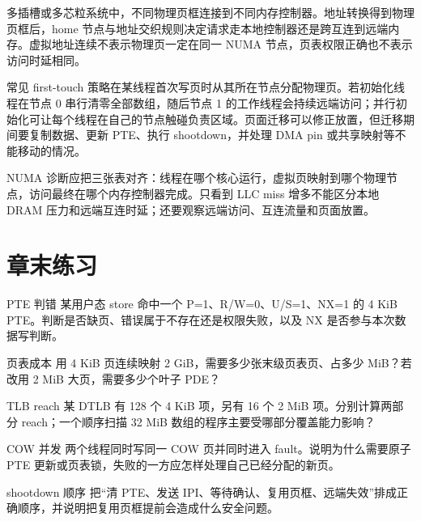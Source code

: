 
多插槽或多芯粒系统中，不同物理页框连接到不同内存控制器。地址转换得到物理页框后，home 节点与地址交织规则决定请求走本地控制器还是跨互连到远端内存。虚拟地址连续不表示物理页一定在同一 NUMA 节点，页表权限正确也不表示访问时延相同。

常见 first-touch 策略在某线程首次写页时从其所在节点分配物理页。若初始化线程在节点 0 串行清零全部数组，随后节点 1 的工作线程会持续远端访问；并行初始化可让每个线程在自己的节点触碰负责区域。页面迁移可以修正放置，但迁移期间要复制数据、更新 PTE、执行 shootdown，并处理 DMA pin 或共享映射等不能移动的情况。

NUMA 诊断应把三张表对齐：线程在哪个核心运行，虚拟页映射到哪个物理节点，访问最终在哪个内存控制器完成。只看到 LLC miss 增多不能区分本地 DRAM 压力和远端互连时延；还要观察远端访问、互连流量和页面放置。

\section*{章末练习}

\begin{chapterexercise}{PTE 判错}
某用户态 store 命中一个 P=1、R/W=0、U/S=1、NX=1 的 4 KiB PTE。判断是否缺页、错误属于不存在还是权限失败，以及 NX 是否参与本次数据写判断。
\end{chapterexercise}

\begin{chapterexercise}{页表成本}
用 4 KiB 页连续映射 2 GiB，需要多少张末级页表页、占多少 MiB？若改用 2 MiB 大页，需要多少个叶子 PDE？
\end{chapterexercise}

\begin{chapterexercise}{TLB reach}
某 DTLB 有 128 个 4 KiB 项，另有 16 个 2 MiB 项。分别计算两部分 reach；一个顺序扫描 32 MiB 数组的程序主要受哪部分覆盖能力影响？
\end{chapterexercise}

\begin{chapterexercise}{COW 并发}
两个线程同时写同一 COW 页并同时进入 fault。说明为什么需要原子 PTE 更新或页表锁，失败的一方应怎样处理自己已经分配的新页。
\end{chapterexercise}

\begin{chapterexercise}{shootdown 顺序}
把“清 PTE、发送 IPI、等待确认、复用页框、远端失效”排成正确顺序，并说明把复用页框提前会造成什么安全问题。
\end{chapterexercise}

